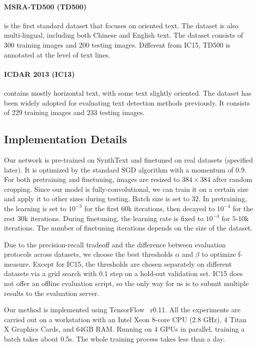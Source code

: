\documentclass[10pt,twocolumn,letterpaper]{article}
\begin{document}
\paragraph{MSRA-TD500 (TD500)~\cite{cvpr/YaoBLMT12}} is the first standard dataset that focuses on oriented text.
The dataset is also multi-lingual, including both Chinese and English text.
The dataset consists of 300 training images and 200 testing images.
Different from IC15, TD500 is annotated at the level of text lines.

\paragraph{ICDAR 2013 (IC13)~\cite{icdar/KaratzasSUIBMMMAH13}} contains mostly horizontal text, with some text slightly oriented.
The dataset has been widely adopted for evaluating text detection methods previously.
It consists of 229 training images and 233 testing images.

\subsection{Implementation Details}
Our network is pre-trained on SynthText and finetuned on real datasets (specified later).
It is optimized by the standard SGD algorithm with a momentum of $0.9$.
For both pretraining and finetuning, images are resized to $384\times384$ after random cropping.
Since our model is fully-convolutional, we can train it on a certain size and apply it to other sizes during testing.
Batch size is set to $32$.
In pretraining, the learning is set to $10^{-3}$ for the first $60$k iterations, then decayed to $10^{-4}$ for the rest $30$k iterations.
During finetuning, the learning rate is fixed to $10^{-4}$ for $5$-$10$k iterations.
The number of finetuning iterations depends on the size of the dataset.

Due to the precision-recall tradeoff and the difference between evaluation protocols across datasets, we choose the best thresholds $\alpha$ and $\beta$ to optimize f-measure.
Except for IC15, the thresholds are chosen separately on different datasets via a grid search with $0.1$ step on a hold-out validation set.
IC15 does not offer an offline evaluation script, so the only way for us is to submit multiple results to the evaluation server.

Our method is implemented using TensorFlow~\cite{tensorflow2015-whitepaper} r0.11.
All the experiments are carried out on a workstation with an Intel Xeon 8-core CPU (2.8 GHz), 4 Titan X Graphics Cards, and 64GB RAM.
Running on 4 GPUs in parallel, training a batch takes about 0.5s.
The whole training process takes less than a day.
\end{document}
